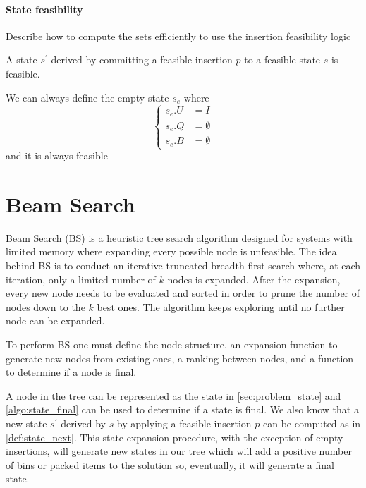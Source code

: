 \paragraph*{State feasibility}
Describe how to compute the sets efficiently to use the insertion feasibility logic\\


\begin{proposition}
    \label{prop:feasible_expansion}
    A state $s^\prime$ derived by committing a feasible insertion $p$ to a feasible state $s$ is feasible.
\end{proposition}

\begin{observation}
    \label{def:empty_state}
    We can always define the empty state $s_e$ where \begin{equation*}
        \left\{ 
            \begin{aligned}
            s_e.U & = I \\
            s_e.Q & = \emptyset \\
            s_e.B & = \emptyset
            \end{aligned}
        \right.
    \end{equation*}
    and it is always feasible
\end{observation}

\section{Beam Search}
\label{sec:beamsearch}%
Beam Search (BS) %
is a heuristic tree search algorithm designed for systems with limited memory where expanding every possible node is unfeasible.
The idea behind BS is to conduct an iterative truncated breadth-first search where, at each iteration, only a limited number of $k$ nodes is expanded.
After the expansion, every new node needs to be evaluated and sorted in order to prune the number of nodes down to the $k$ best ones. The algorithm keeps exploring until no further node can be expanded.

To perform BS one must define the node structure, an expansion function to generate new nodes from existing ones, a ranking between nodes, and a function to determine if a node is final.

A node in the tree can be represented as the state in \cref{sec:problem_state} and \cref{algo:state_final} can be used to determine if a state is final. We also know that a new state $s^\prime$ derived by $s$ by applying a feasible insertion $p$ can be computed as in \cref{def:state_next}.
This state expansion procedure, with the exception of empty insertions, will generate new states in our tree which will add a positive number of bins or packed items to the solution so, eventually, it will generate a final state.


